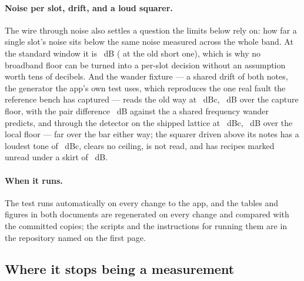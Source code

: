 \documentclass[11pt,a4paper]{article}
\begin{document}
\paragraph{Noise per slot, drift, and a loud squarer.} The wire through noise also settles a question the limits below rely
on: how far a single slot's noise sits below the same noise measured
across the whole band. At the standard window it is
\iparityPerBinLong{}~dB (\iparityPerBinShort{} at the old short one),
which is why no broadband floor can be turned into a per-slot decision
without an assumption worth tens of decibels. And the wander fixture ---
a shared drift of both notes, the generator the app's own test uses,
which reproduces the one real fault the reference bench has captured ---
reads the old way at \iparityWanderLegacyWorst{}~dBc,
\iparityWanderLegacyExcess{}~dB over the capture floor, with the pair
difference \iparityWanderLegacyPairDifference{}~dB against the
\iparityWanderExpectedDifference{} a shared frequency wander predicts,
and through the detector on the shipped lattice at
\iparityWanderShippedWorst{}~dBc, \iparityWanderShippedExcess{}~dB over
the local floor --- far over the bar either way; the squarer driven above
its notes has a loudest tone of \iparityLoudLoudest{}~dBc, clears no
ceiling, is not read, and has \iparityLoudUnderSkirt{} recipes marked
unread under a skirt of \iparityLoudSkirt{}~dB.

\paragraph{When it runs.} The test runs automatically on every change to the app, and the tables
and figures in both documents are regenerated on every change and
compared with the committed copies; the scripts and the instructions for
running them are in the repository named on the first page.

\subsection{Where it stops being a measurement}
\end{document}
